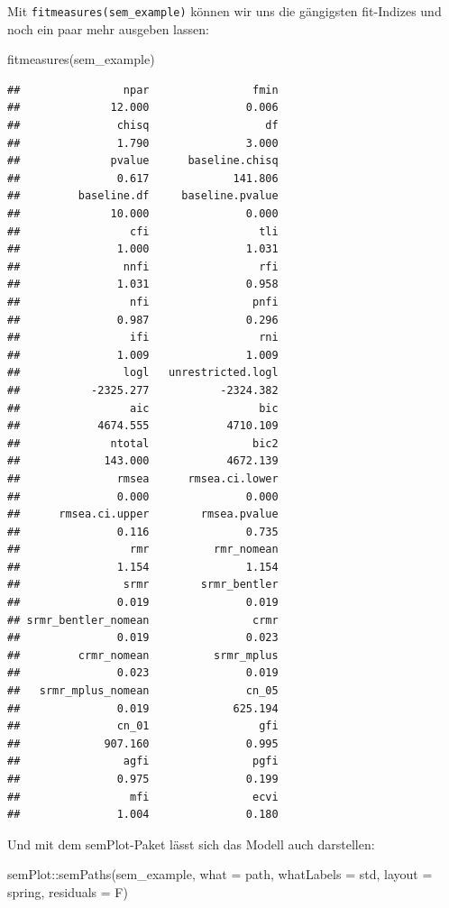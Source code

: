 \documentclass[
]{book}
\newenvironment{Shaded}{\begin{snugshade}}{\end{snugshade}}
\newcommand{\AttributeTok}[1]{\textcolor[rgb]{0.77,0.63,0.00}{#1}}
\newcommand{\FunctionTok}[1]{\textcolor[rgb]{0.00,0.00,0.00}{#1}}
\newcommand{\NormalTok}[1]{#1}
\newcommand{\SpecialCharTok}[1]{\textcolor[rgb]{0.00,0.00,0.00}{#1}}
\newcommand{\StringTok}[1]{\textcolor[rgb]{0.31,0.60,0.02}{#1}}
\begin{document}
Mit \texttt{fitmeasures(sem\_example)} können wir uns die gängigsten fit-Indizes und noch ein paar mehr ausgeben lassen:

\begin{Shaded}
\begin{Highlighting}[]
\FunctionTok{fitmeasures}\NormalTok{(sem\_example)}
\end{Highlighting}
\end{Shaded}

\begin{verbatim}
##                npar                fmin 
##              12.000               0.006 
##               chisq                  df 
##               1.790               3.000 
##              pvalue      baseline.chisq 
##               0.617             141.806 
##         baseline.df     baseline.pvalue 
##              10.000               0.000 
##                 cfi                 tli 
##               1.000               1.031 
##                nnfi                 rfi 
##               1.031               0.958 
##                 nfi                pnfi 
##               0.987               0.296 
##                 ifi                 rni 
##               1.009               1.009 
##                logl   unrestricted.logl 
##           -2325.277           -2324.382 
##                 aic                 bic 
##            4674.555            4710.109 
##              ntotal                bic2 
##             143.000            4672.139 
##               rmsea      rmsea.ci.lower 
##               0.000               0.000 
##      rmsea.ci.upper        rmsea.pvalue 
##               0.116               0.735 
##                 rmr          rmr_nomean 
##               1.154               1.154 
##                srmr        srmr_bentler 
##               0.019               0.019 
## srmr_bentler_nomean                crmr 
##               0.019               0.023 
##         crmr_nomean          srmr_mplus 
##               0.023               0.019 
##   srmr_mplus_nomean               cn_05 
##               0.019             625.194 
##               cn_01                 gfi 
##             907.160               0.995 
##                agfi                pgfi 
##               0.975               0.199 
##                 mfi                ecvi 
##               1.004               0.180
\end{verbatim}

Und mit dem semPlot-Paket lässt sich das Modell auch darstellen:

\begin{Shaded}
\begin{Highlighting}[]
\NormalTok{semPlot}\SpecialCharTok{::}\FunctionTok{semPaths}\NormalTok{(sem\_example, }
                  \AttributeTok{what =} \StringTok{\textquotesingle{}path\textquotesingle{}}\NormalTok{, }
                  \AttributeTok{whatLabels =} \StringTok{\textquotesingle{}std\textquotesingle{}}\NormalTok{, }
                  \AttributeTok{layout =} \StringTok{\textquotesingle{}spring\textquotesingle{}}\NormalTok{, }
                  \AttributeTok{residuals =}\NormalTok{ F)}
\end{Highlighting}
\end{Shaded}
\end{document}
